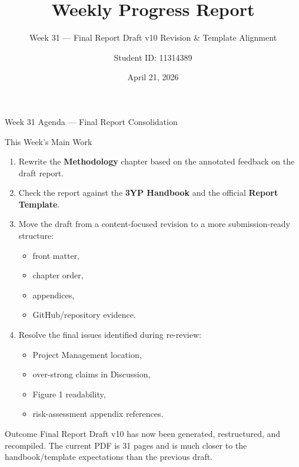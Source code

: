\documentclass[aspectratio=169, 11pt]{beamer}
\title{Weekly Progress Report}
\subtitle{Week 31 --- Final Report Draft v10 Revision \& Template Alignment}
\author{Student ID: 11314389}
\institute{BCI Control System Project}
\date{April 21, 2026}
\begin{document}
\begin{frame}
    \titlepage
\end{frame}

\begin{frame}[shrink=8]{Week 31 Agenda --- Final Report Consolidation}

    \begin{block}{This Week's Main Work}
        \begin{enumerate}
            \item Rewrite the \textbf{Methodology} chapter based on the annotated feedback on the draft report.
            \item Check the report against the \textbf{3YP Handbook} and the official \textbf{Report Template}.
            \item Move the draft from a content-focused revision to a more submission-ready structure:
            \begin{itemize}
                \item front matter,
                \item chapter order,
                \item appendices,
                \item GitHub/repository evidence.
            \end{itemize}
            \item Resolve the final issues identified during re-review:
            \begin{itemize}
                \item Project Management location,
                \item over-strong claims in Discussion,
                \item Figure 1 readability,
                \item risk-assessment appendix references.
            \end{itemize}
        \end{enumerate}
    \end{block}

    \vspace{2mm}
    \begin{alertblock}{Outcome}
        Final Report Draft v10 has now been generated, restructured, and recompiled. The current PDF is 31 pages and is much closer to the handbook/template expectations than the previous draft.
    \end{alertblock}
\end{frame}
\end{document}
